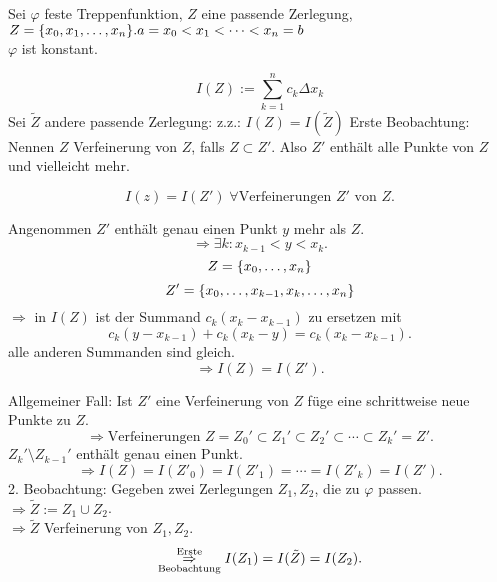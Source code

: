 \documentclass[../ana2.tex]{subfiles}
\begin{document}
\begin{bew}
    Sei \( \varphi \) feste Treppenfunktion, \(Z\) eine passende 
    Zerlegung, \( Z=\{x_0, x_1,\dots, x_n\}.\\
    a=x_0<x_1<\cdots<x_n=b \) \\
    \( \varphi \) ist konstant.
    
    \[ I(Z) := \sum_{k=1}^n c_k \Delta x_k \]
    Sei \(\tilde{Z}\) andere passende Zerlegung: 
    z.z.: \(I(Z) = I(\tilde{Z})\)
    Erste Beobachtung: Nennen \( Z \) Verfeinerung von \( Z \), 
    falls \( Z \subset Z' \). Also \( Z' \) enthält alle Punkte 
    von \(Z\) und vielleicht mehr.
    \begin{beh}
        \[ I(z) = I(Z') \; \forall \text{Verfeinerungen } Z' \text{ von } Z. \]
    \end{beh}
    \begin{bew}
        Angenommen \(Z'\) enthält genau einen Punkt \(y\) mehr 
        als \(Z\).
        \[ \Rightarrow \exists k : x_{k-1} < y < x_k. \]
        \[ Z = \{x_0,\ldots,x_n\} \]
        \[ Z' = \{x_0,\ldots,x_{k-1}, x_k,\ldots,x_n\} \]
        \(\Rightarrow \) in \(I(Z)\) ist der Summand 
        \( c_k(x_k - x_{k-1}) \) zu ersetzen mit 
        \[ c_k(y - x_{k-1}) + c_k(x_k - y) 
        = c_k(x_k - x_{k-1}). \]
        alle anderen Summanden sind gleich.
        \[ \Rightarrow I(Z) = I(Z'). \]
    \end{bew}
    Allgemeiner Fall: Ist \(Z'\) eine Verfeinerung von \(Z\)
    füge eine schrittweise neue Punkte zu \(Z\).
    \[ \Rightarrow \text{Verfeinerungen } Z = Z_0' 
    \subset Z_1' \subset Z_2' \subset \cdots \subset Z_k' = Z'. \]
    \( Z_k' \setminus Z_{k-1}' \) enthält genau einen Punkt.
    \[ \Rightarrow I(Z) = I(Z'_0) = I(Z'_1) 
    = \cdots = I(Z'_k) = I(Z'). \]
    2. Beobachtung: Gegeben zwei Zerlegungen \(Z_1, Z_2\), die zu 
    \( \varphi \) passen.\\
    \( \Rightarrow \tilde{Z} := Z_1 \cup Z_2 \).\\
    \( \Rightarrow \tilde{Z} \) Verfeinerung von \( Z_1, Z_2 \).
    \[ \overset{\text{Erste}}{\underset{\text{Beobachtung}}{\Rightarrow}} 
    I(Z_1) = I(\tilde{Z}) = I(Z_2). \]
\end{bew}
\end{document}
